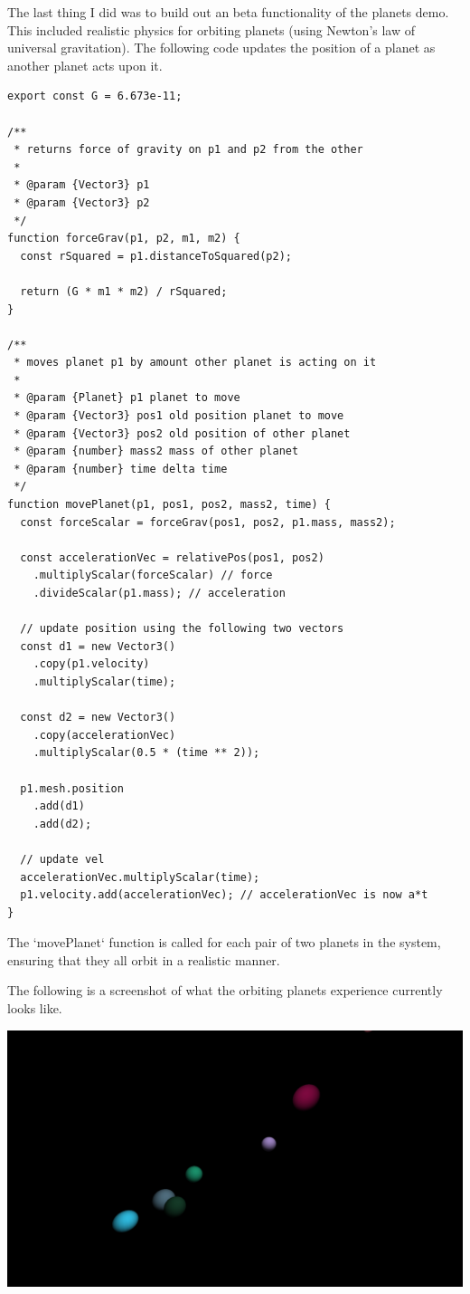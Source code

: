 \documentclass[onecolumn, draftclsnofoot,10pt, compsoc]{IEEEtran}
\begin{document}
The last thing I did was to build out an beta functionality of the planets demo. This included realistic physics for orbiting planets (using Newton's law of universal gravitation). The following code updates the position of a planet as another planet acts upon it. 
\begin{lstlisting}
export const G = 6.673e-11;

/**
 * returns force of gravity on p1 and p2 from the other
 *
 * @param {Vector3} p1
 * @param {Vector3} p2
 */
function forceGrav(p1, p2, m1, m2) {
  const rSquared = p1.distanceToSquared(p2);

  return (G * m1 * m2) / rSquared;
}

/**
 * moves planet p1 by amount other planet is acting on it
 *
 * @param {Planet} p1 planet to move
 * @param {Vector3} pos1 old position planet to move
 * @param {Vector3} pos2 old position of other planet
 * @param {number} mass2 mass of other planet
 * @param {number} time delta time
 */
function movePlanet(p1, pos1, pos2, mass2, time) {
  const forceScalar = forceGrav(pos1, pos2, p1.mass, mass2);

  const accelerationVec = relativePos(pos1, pos2)
    .multiplyScalar(forceScalar) // force
    .divideScalar(p1.mass); // acceleration

  // update position using the following two vectors
  const d1 = new Vector3()
    .copy(p1.velocity)
    .multiplyScalar(time);

  const d2 = new Vector3()
    .copy(accelerationVec)
    .multiplyScalar(0.5 * (time ** 2));

  p1.mesh.position
    .add(d1)
    .add(d2);

  // update vel
  accelerationVec.multiplyScalar(time);
  p1.velocity.add(accelerationVec); // accelerationVec is now a*t
}
\end{lstlisting}
The `movePlanet` function is called for each pair of two planets in the system, ensuring that they all orbit in a realistic manner. 

The following is a screenshot of what the orbiting planets experience currently looks like.

\includegraphics[width=\linewidth]{images/planets.png}
\end{document}
